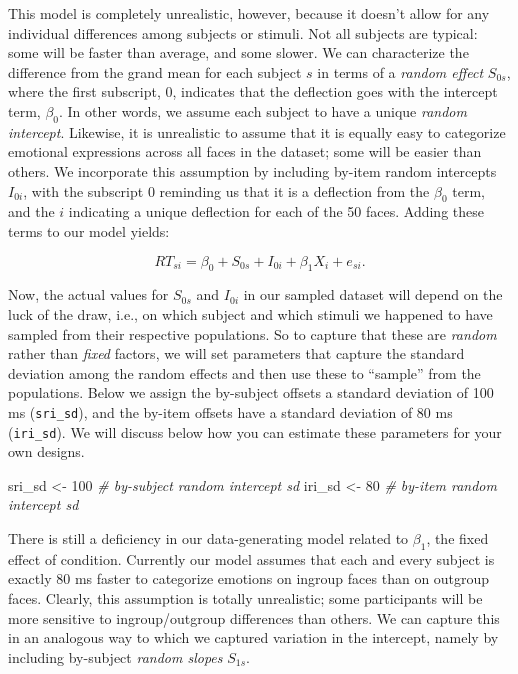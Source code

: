 \documentclass[man,floatsintext]{apa6}
\newenvironment{Shaded}{\begin{snugshade}}{\end{snugshade}}
\newcommand{\DecValTok}[1]{\textcolor[rgb]{0.00,0.00,0.81}{#1}}
\newcommand{\StringTok}[1]{\textcolor[rgb]{0.31,0.60,0.02}{#1}}
\newcommand{\CommentTok}[1]{\textcolor[rgb]{0.56,0.35,0.01}{\textit{#1}}}
\newcommand{\NormalTok}[1]{#1}
\begin{document}
This model is completely unrealistic, however, because it doesn't allow
for any individual differences among subjects or stimuli. Not all
subjects are typical: some will be faster than average, and some slower.
We can characterize the difference from the grand mean for each subject
\(s\) in terms of a \emph{random effect} \(S_{0s}\), where the first
subscript, 0, indicates that the deflection goes with the intercept
term, \(\beta_0\). In other words, we assume each subject to have a
unique \emph{random intercept}. Likewise, it is unrealistic to assume
that it is equally easy to categorize emotional expressions across all
faces in the dataset; some will be easier than others. We incorporate
this assumption by including by-item random intercepts \(I_{0i}\), with
the subscript 0 reminding us that it is a deflection from the
\(\beta_0\) term, and the \(i\) indicating a unique deflection for each
of the 50 faces. Adding these terms to our model yields:

\[RT_{si} = \beta_0 + S_{0s} + I_{0i} + \beta_1 X_i + e_{si}.\]

Now, the actual values for \(S_{0s}\) and \(I_{0i}\) in our sampled
dataset will depend on the luck of the draw, i.e., on which subject and
which stimuli we happened to have sampled from their respective
populations. So to capture that these are \emph{random} rather than
\emph{fixed} factors, we will set parameters that capture the standard
deviation among the random effects and then use these to
\enquote{sample} from the populations. Below we assign the by-subject
offsets a standard deviation of 100 ms (\texttt{sri\_sd}), and the
by-item offsets have a standard deviation of 80 ms (\texttt{iri\_sd}).
We will discuss below how you can estimate these parameters for your own
designs.

\begin{Shaded}
\begin{Highlighting}[]
\NormalTok{sri_sd <-}\StringTok{ }\DecValTok{100} \CommentTok{# by-subject random intercept sd}
\NormalTok{iri_sd <-}\StringTok{  }\DecValTok{80} \CommentTok{# by-item random intercept sd}
\end{Highlighting}
\end{Shaded}

There is still a deficiency in our data-generating model related to
\(\beta_1\), the fixed effect of condition. Currently our model assumes
that each and every subject is exactly 80 ms faster to categorize
emotions on ingroup faces than on outgroup faces. Clearly, this
assumption is totally unrealistic; some participants will be more
sensitive to ingroup/outgroup differences than others. We can capture
this in an analogous way to which we captured variation in the
intercept, namely by including by-subject \emph{random slopes}
\(S_{1s}\).
\end{document}
